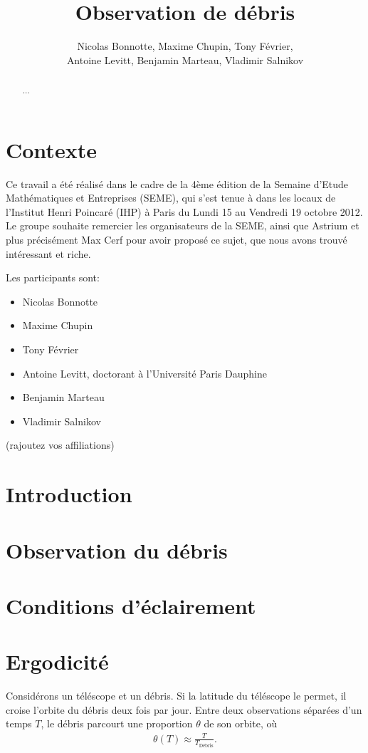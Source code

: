 \documentclass[11pt,a4paper,reqno]{amsart}
\author{Nicolas Bonnotte, Maxime Chupin, Tony Février,\\ Antoine Levitt,
  Benjamin Marteau, Vladimir Salnikov}
\begin{document}
\title{Observation de débris}

\maketitle
\begin{abstract}
  ...
\end{abstract}

\section{Contexte}
Ce travail a été réalisé dans le cadre de la 4ème édition de la
Semaine d'Etude Mathématiques et Entreprises (SEME), qui s'est tenue à
dans les locaux de l'Institut Henri Poincaré (IHP) à Paris du Lundi 15
au Vendredi 19 octobre 2012. Le groupe souhaite remercier les
organisateurs de la SEME, ainsi que Astrium et plus précisément Max
Cerf pour avoir proposé ce sujet, que nous avons trouvé intéressant et
riche.

Les participants sont:
\begin{itemize}
\item Nicolas Bonnotte
\item Maxime Chupin
\item Tony Février
\item Antoine Levitt, doctorant à l'Université Paris Dauphine
\item Benjamin Marteau
\item Vladimir Salnikov
\end{itemize}
(rajoutez vos affiliations)
\section{Introduction}
\section{Observation du débris}
\section{Conditions d'éclairement}
\section{Ergodicité}
Considérons un téléscope et un débris. Si la latitude du téléscope le
permet, il croise l'orbite du débris deux fois par jour. Entre deux
observations séparées d'un temps $T$, le débris parcourt une
proportion $\theta$ de son orbite, où
\begin{align*}
  \theta(T) \approx \frac T {T_{\text{Débris}}}.
\end{align*}
\end{document}
